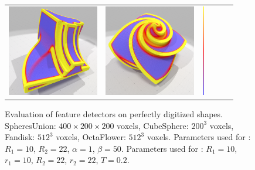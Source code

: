 \begin{figure}[ht]
\begin{center}
\begin{tabular}{l c c c cl}
      \includegraphics[width=4.0cm]{images/Feature/Fandisk_VCM_r_22} &
      \includegraphics[width=4.0cm]{images/Feature/OctaFlower_512_VCM_r_22} &
      \includegraphics[width=0.1cm,height=4cm]{images/YMTB6W}
    \end{tabular}
    \caption[Evaluation of feature detectors on perfectly digitized shapes.]{Evaluation of feature detectors on perfectly digitized shapes.
    SpheresUnion: $400 \times 200 \times 200$ voxels, CubeSphere: $200^3$ voxels, Fandisk: $512^3$ voxels, OctaFlower: $512^3$ voxels.
    Parameters used for \cite{Telea2004}: $R_1 = 10$, $R_2 = 22$, $\alpha = 1$, $\beta = 50$.
    Parameters used for \cite{Merigot2011}: $R_1 = 10$, $r_1 = 10$, $R_2 = 22$, $r_2 = 22$, $T = 0.2$.\label{fig:feature-comparative}}
  \end{center}
\end{figure}

